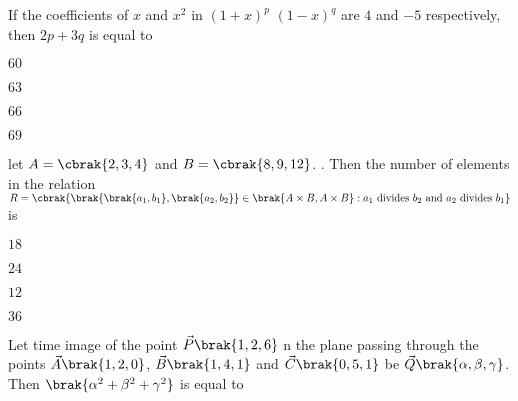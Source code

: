 \iffalse
\title{Assignment-3}
\author{EE24BTECH11049-Patnam Shariq Faraz Muhammed}
\section{mcq-single}
\fi

%
    \item 
    If the coefficients of $x$ and $x^2$ in $(1 + x)^p$ $(1 - x)^q$ are $4$ and $-5$ respectively, then $2p + 3q$ is equal to

    \hfill{}

    \begin{enumerate}
    \begin{multicols}{4}
        \item $60$
        \item $63$
        \item $66$
        \item $69$
    \end{multicols}
    \end{enumerate}

    \item 
    let $A = \cbrak{2, 3, 4}$ and $B =  \cbrak{8, 9, 12}$. . Then the number of elements in the relation $R = \cbrak{\brak{\brak{a_1, b_1}, \brak{a_2, b_2}} \in \brak{A \times B, A \times B} : a_1 \text{ divides } b_2 \text{ and } a_2 \text{ divides } b_1}$ is 

    \hfill{}

    \begin{enumerate}
    \begin{multicols}{4}
        \item $18$
        \item $24$
        \item $12$
        \item $36$
    \end{multicols}
    \end{enumerate}

    \item 
    Let time image of the point $\vec{P}\brak{1, 2, 6}$ n the plane passing through the points $\vec{A}\brak{1, 2, 0}$, $\vec{B}\brak{1, 4, 1}$ and $\vec{C}\brak{0, 5, 1}$ be $\vec{Q}\brak{\alpha, \beta, \gamma}$. Then $\brak{\alpha^2 + \beta^2 + \gamma^2}$ is equal to

    \hfill{}

